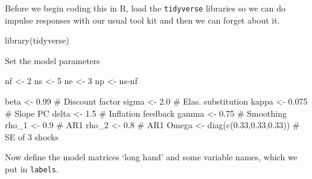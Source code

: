 \documentclass[
  letterpaper,
]{book}
\newenvironment{Shaded}{\begin{snugshade}}{\end{snugshade}}
\newcommand{\CommentTok}[1]{\textcolor[rgb]{0.37,0.37,0.37}{#1}}
\newcommand{\DecValTok}[1]{\textcolor[rgb]{0.68,0.00,0.00}{#1}}
\newcommand{\FloatTok}[1]{\textcolor[rgb]{0.68,0.00,0.00}{#1}}
\newcommand{\FunctionTok}[1]{\textcolor[rgb]{0.28,0.35,0.67}{#1}}
\newcommand{\NormalTok}[1]{\textcolor[rgb]{0.00,0.23,0.31}{#1}}
\newcommand{\OtherTok}[1]{\textcolor[rgb]{0.00,0.23,0.31}{#1}}
\newcommand{\SpecialCharTok}[1]{\textcolor[rgb]{0.37,0.37,0.37}{#1}}
\begin{document}
Before we begin coding this in R, load the \texttt{tidyverse} libraries
so we can do impulse responses with our usual tool kit and then we can
forget about it.

\begin{Shaded}
\begin{Highlighting}[]
\FunctionTok{library}\NormalTok{(tidyverse)}
\end{Highlighting}
\end{Shaded}

Set the model parameters

\begin{Shaded}
\begin{Highlighting}[]
\NormalTok{nf    }\OtherTok{\textless{}{-}} \DecValTok{2}
\NormalTok{ns    }\OtherTok{\textless{}{-}} \DecValTok{5}
\NormalTok{ne    }\OtherTok{\textless{}{-}} \DecValTok{3}
\NormalTok{np    }\OtherTok{\textless{}{-}}\NormalTok{ ns}\SpecialCharTok{{-}}\NormalTok{nf}

\NormalTok{beta  }\OtherTok{\textless{}{-}} \FloatTok{0.99}   \CommentTok{\# Discount factor }
\NormalTok{sigma }\OtherTok{\textless{}{-}} \FloatTok{2.0}    \CommentTok{\# Elas. substitution}
\NormalTok{kappa }\OtherTok{\textless{}{-}} \FloatTok{0.075}  \CommentTok{\# Slope PC}
\NormalTok{delta }\OtherTok{\textless{}{-}} \FloatTok{1.5}    \CommentTok{\# Inflation feedback}
\NormalTok{gamma }\OtherTok{\textless{}{-}} \FloatTok{0.75}   \CommentTok{\# Smoothing}
\NormalTok{rho\_1 }\OtherTok{\textless{}{-}} \FloatTok{0.9}    \CommentTok{\# AR1}
\NormalTok{rho\_2 }\OtherTok{\textless{}{-}} \FloatTok{0.8}    \CommentTok{\# AR1}
\NormalTok{Omega }\OtherTok{\textless{}{-}} \FunctionTok{diag}\NormalTok{(}\FunctionTok{c}\NormalTok{(}\FloatTok{0.33}\NormalTok{,}\FloatTok{0.33}\NormalTok{,}\FloatTok{0.33}\NormalTok{)) }\CommentTok{\# SE of 3 shocks}
\end{Highlighting}
\end{Shaded}

Now define the model matrices `long hand' and some variable names, which
we put in \texttt{labels}.
\end{document}
